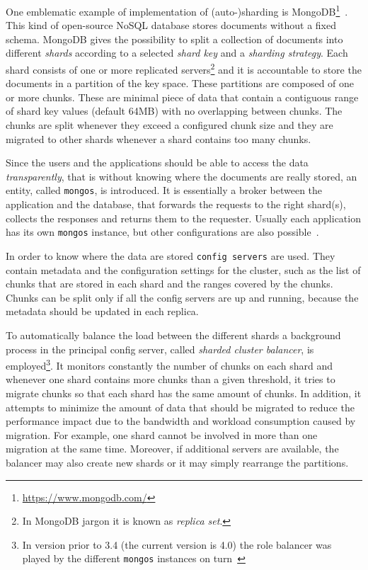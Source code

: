 One emblematic example of implementation of (auto-)sharding is
MongoDB\footnote{\url{https://www.mongodb.com/}}~\cite{bib:mongodb}. This kind
of open-source NoSQL database stores documents without a fixed schema.
MongoDB gives the possibility to split a collection of documents into 
different \emph{shards} according to a selected \emph{shard key} and a 
\emph{sharding strategy}. Each shard consists of one or more replicated 
servers\footnote{In MongoDB jargon it is known as \emph{replica set}.} and
it is accountable to store the documents in a partition of the key space.
These partitions are composed of one or more chunks. These are minimal piece of
data that contain a contiguous range of shard key values (default 64MB) with no
overlapping between chunks. The chunks are split whenever they exceed a 
configured chunk size and they are migrated to other shards whenever a shard 
contains too many chunks.

Since the users and the applications should be able to access the data 
\emph{transparently}, that is without knowing where the documents are really 
stored, an entity, called \texttt{mongos}, is introduced. It is essentially a 
broker between the application and the database, that forwards the requests to 
the right shard(s), collects the responses and returns them to the requester. 
Usually each application has its own \texttt{mongos} instance, but other 
configurations are also possible~\cite{bib:mongodb}.

In order to know where the data are stored \texttt{config servers} are
used. They contain metadata and the configuration settings for the 
cluster, such as the list of chunks that are stored in each shard and the ranges
covered by the chunks. Chunks can be split only if all the config servers are 
up and running, because the metadata should be updated in each replica.

To automatically balance the load between the different shards a background 
process in the principal config server, called \emph{sharded cluster balancer}, 
is employed\footnote{In version prior to 3.4 (the current version is 4.0) the
role balancer was played by the different \texttt{mongos} 
instances on turn~\cite{bib:mongodb-docs}}. It monitors constantly the number
of chunks on each shard and  whenever one  shard contains more chunks than a 
given threshold, it tries to migrate chunks so that each shard has the same 
amount of chunks. In addition, it attempts to minimize the amount of data 
that should be migrated to reduce the performance impact due to the bandwidth 
and workload consumption caused by migration. For example, one shard cannot be 
involved in more than one migration at the same time. Moreover, if additional 
servers are available, the balancer may also create new shards or it may simply 
rearrange the partitions.

